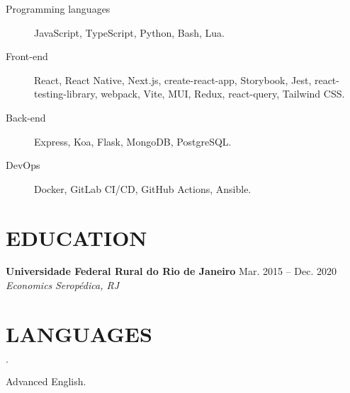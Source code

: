 \documentclass[12pt]{article}
\newenvironment{tightlist}
  {\begin{list}
    {$\cdot$}
    {
      \setlength{\leftmargin}{0em}
      \setlength{\itemsep}{\smallskipamount}
    }
  }
{\end{list}}
\begin{document}
\begin{description}
  \item[Programming languages] JavaScript, TypeScript, Python, Bash, Lua.
  \item[Front-end] React, React Native, Next.js, create-react-app,
    Storybook, Jest, react-testing-library, webpack, Vite,
    MUI, Redux, react-query, Tailwind CSS.
  \item[Back-end] Express, Koa, Flask, MongoDB, PostgreSQL.
  \item[DevOps] Docker, GitLab CI/CD, GitHub Actions, Ansible.
\end{description}

\section*{EDUCATION}

\textbf{Universidade Federal Rural do Rio de Janeiro} \hfill {Mar. 2015 -- Dec. 2020} \\
\textit{Economics} \hfill \textit{Seropédica, RJ} {\parfillskip=0pt\par}

\section*{LANGUAGES}

\begin{tightlist}
  \item Advanced English.
\end{tightlist}
\end{document}
